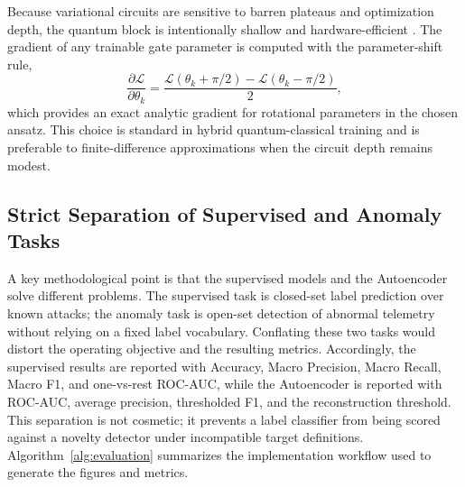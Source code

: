 Because variational circuits are sensitive to barren plateaus and optimization depth, the quantum block is intentionally shallow and hardware-efficient \cite{mcclean2018barren, cerezo2021variational, larocca2024review}. The gradient of any trainable gate parameter is computed with the parameter-shift rule,
\begin{equation}
\frac{\partial \mathcal{L}}{\partial \theta_k}=\frac{\mathcal{L}(\theta_k+\pi/2)-\mathcal{L}(\theta_k-\pi/2)}{2},
\end{equation}
which provides an exact analytic gradient for rotational parameters in the chosen ansatz. This choice is standard in hybrid quantum-classical training and is preferable to finite-difference approximations when the circuit depth remains modest.

\subsection{Strict Separation of Supervised and Anomaly Tasks}
A key methodological point is that the supervised models and the Autoencoder solve different problems. The supervised task is closed-set label prediction over known attacks; the anomaly task is open-set detection of abnormal telemetry without relying on a fixed label vocabulary. Conflating these two tasks would distort the operating objective and the resulting metrics. Accordingly, the supervised results are reported with Accuracy, Macro Precision, Macro Recall, Macro F1, and one-vs-rest ROC-AUC, while the Autoencoder is reported with ROC-AUC, average precision, thresholded F1, and the reconstruction threshold. This separation is not cosmetic; it prevents a label classifier from being scored against a novelty detector under incompatible target definitions. Algorithm~\ref{alg:evaluation} summarizes the implementation workflow used to generate the figures and metrics.


